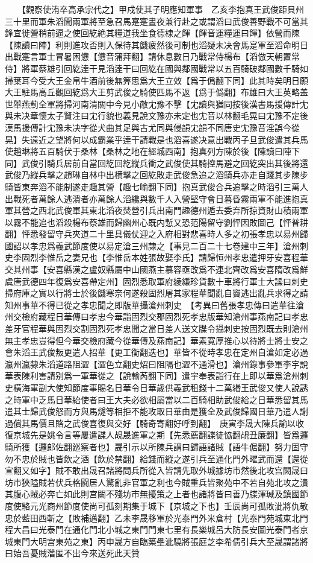 　　【觀察使洧卒高承宗代之】甲戍使其子明應知軍事　乙亥李抱真王武俊距貝州三十里而軍朱滔聞兩軍將至急召馬寔寔晝夜兼行赴之或謂滔曰武俊善野戰不可當其鋒宜徙營稍前逼之使回紇絶其糧道我坐食德棣之餫【餫音運糧運曰餫】依營而陳【陳讀曰陣】利則進攻否則入保待其饑疲然後可制也滔疑未决會馬寔軍至滔命明日出戰寔言軍士冒暑困憊【憊音蒲拜翻】請休息數日乃戰常侍楊布【滔倣天朝置常侍】將軍蔡雄引回紇逹干見滔逹干曰回紇在國與鄰國戰常以五百騎破鄰國數千騎如掃葉耳今受大王金帛牛酒前後無筭思爲大王立效【爲于僞翻下同】此其時矣明日願大王駐馬高丘觀回紇爲大王剪武俊之騎使匹馬不返【爲于僞翻】布雄曰大王英略盖世舉燕薊全軍將掃河南清關中今見小敵冘豫不擊【冘讀與猶同按後漢書馬援傳計冘與未决章懷太子賢注曰冘行貌也義見說文豫亦未定也冘音以林翻毛晃曰冘豫不定後漢馬援傳計冘豫未决字從犬曲其足與古尤同與侵韻冘韻不同唐史冘豫音淫誤今從晃】失遠近之望將何以成霸業乎逹干請戰是也滔喜遂决意出戰丙子旦武俊遣其兵馬使趙琳將五百騎伏于桑林【桑林之地在經城西南】抱真列方陳於後【陳讀曰陣下同】武俊引騎兵居前自當回紇回紇縱兵衝之武俊使其騎控馬避之回紇突出其後將還武俊乃縱兵擊之趙琳自林中出横擊之回紇敗走武俊急追之滔騎兵亦走自踐其步陳步騎皆東奔滔不能制遂走趣其營【趣七喻翻下同】抱真武俊合兵追擊之時滔引三萬人出戰死者萬餘人逃潰者亦萬餘人滔纔與數千人入營堅守會日暮昏霧兩軍不能進抱真軍其營之西北武俊軍其東北滔夜焚營引兵出南門趣德州遁去委弃所掠資財山積兩軍以霧不能追也滔殺楊布蔡雄而歸幽州心既内慙又恐范陽留守劉怦因敗圖己【怦普耕翻】怦悉發留守兵夾道二十里具儀仗迎之入府相對悲喜時人多之初張孝忠以易州歸國詔以孝忠爲義武節度使以易定滄三州隷之【事見二百二十七卷建中三年】滄州刺史李固烈李惟岳之妻兄也【李惟岳本姓張故娶李氏】請歸恒州孝忠遣押牙安喜程華交其州事【安喜縣漢之盧奴縣屬中山國燕主慕容亟改爲不連北齊改爲安喜隋改爲鮮虞唐武德四年復爲安喜帶定州】固烈悉取軍府綾縑珍貨數十車將行軍士大譟曰刺史掃府庫之實以行將士於後饑寒奈何遂殺固烈屠其家程華聞亂自竇逃出亂兵求得之請知州事華不得已從之孝忠聞之即版華攝滄州刺史　【考異曰舊張孝忠傳曰遣華往滄州交檢府藏程日華傳曰孝忠今華詣固烈交郡固烈死孝忠版華知滄州事燕南記曰孝忠差牙官程華與固烈交割固烈死孝忠聞之當日差人送文牒令攝刺史按固烈既去則滄州無主孝忠豈得但今華交檢府藏今從華傳及燕南記】華素寛厚推心以待將士將士安之會朱滔王武俊叛更遣人招華【更工衡翻迭也】華皆不從時孝忠在定州自滄如定必過瀛州瀛隸朱滔道路阻澀【澀色立翻史炤曰阻隔也澀不通滑也】滄州錄事參軍李宇說華表陳利害請别爲一軍華從之【說輸芮翻下同】遣宇奉表詣行在上即以華爲滄州刺史橫海軍副大使知節度事賜名日華令日華歲供義武租錢十二萬緡王武俊又使人說誘之時軍中乏馬日華紿使者曰王大夫必欲相屬當以二百騎相助武俊給之日華悉留其馬遣其士歸武俊怒而方與馬燧等相拒不能攻取日華由是獲全及武俊歸國日華乃遣人謝過償其馬價且賂之武俊喜復與交好【騎奇寄翻好呼到翻】　庚寅李晟大陳兵諭以收復京城先是姚令言等屢遣諜人覘晟進軍之期【先悉薦翻諜徒恊翻覘丑廉翻】皆爲邏騎所獲【邏郎佐翻廵察者也】晟引示以所陳兵謂曰歸語諸賊【語牛倨翻】努力固守勿不忠於賊也皆飲之酒【飲於禁翻】給錢而縱之遂引兵至通化門外曜武而還【還從宣翻又如字】賊不敢出晟召諸將問兵所從入皆請先取外城據坊市然後北攻宫闕晟曰坊市狹隘賊若伏兵格闘居人驚亂非官軍之利也今賊重兵皆聚苑中不若自苑北攻之潰其腹心賊必奔亡如此則宫闕不殘坊市無擾策之上者也諸將皆曰善乃牒渾瑊及鎮國節度使駱元光商州節度使尚可孤刻期集于城下【京城之下也】壬辰尚可孤敗泚將仇敬忠於藍田西斬之【敗補邁翻】乙未李晟移軍於光泰門外米倉村【光泰門苑城東北門程大昌曰光泰門在通化門北小城之東門門東七里有長樂城呂大防長安圖光泰門者京城東門大明宫東苑之東】丙申晟方自臨築壘泚驍將張庭芝李希倩引兵大至晟謂諸將曰始吾憂賊濳匿不出今來送死此天贊